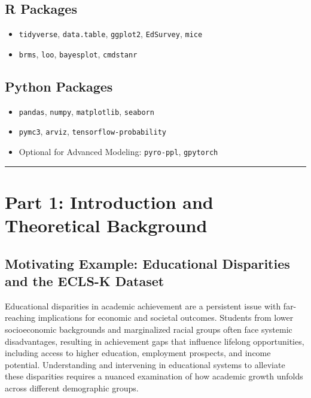 \documentclass[
  letterpaper,
  DIV=11,
  numbers=noendperiod]{scrreprt}
\providecommand{\tightlist}{%
  \setlength{\itemsep}{0pt}\setlength{\parskip}{0pt}}\usepackage{longtable,booktabs,array}
\begin{document}
\subsection{R Packages}\label{r-packages}

\begin{itemize}
\tightlist
\item
  \texttt{tidyverse}, \texttt{data.table}, \texttt{ggplot2},
  \texttt{EdSurvey}, \texttt{mice}
\item
  \texttt{brms}, \texttt{loo}, \texttt{bayesplot}, \texttt{cmdstanr}
\end{itemize}

\subsection{Python Packages}\label{python-packages}

\begin{itemize}
\tightlist
\item
  \texttt{pandas}, \texttt{numpy}, \texttt{matplotlib}, \texttt{seaborn}
\item
  \texttt{pymc3}, \texttt{arviz}, \texttt{tensorflow-probability}
\item
  Optional for Advanced Modeling: \texttt{pyro-ppl}, \texttt{gpytorch}
\end{itemize}

\begin{center}\rule{0.5\linewidth}{0.5pt}\end{center}

\section{Part 1: Introduction and Theoretical
Background}\label{part-1-introduction-and-theoretical-background}

\subsection{Motivating Example: Educational Disparities and the ECLS-K
Dataset}\label{motivating-example-educational-disparities-and-the-ecls-k-dataset}

Educational disparities in academic achievement are a persistent issue
with far-reaching implications for economic and societal outcomes.
Students from lower socioeconomic backgrounds and marginalized racial
groups often face systemic disadvantages, resulting in achievement gaps
that influence lifelong opportunities, including access to higher
education, employment prospects, and income potential. Understanding and
intervening in educational systems to alleviate these disparities
requires a nuanced examination of how academic growth unfolds across
different demographic groups.
\end{document}
